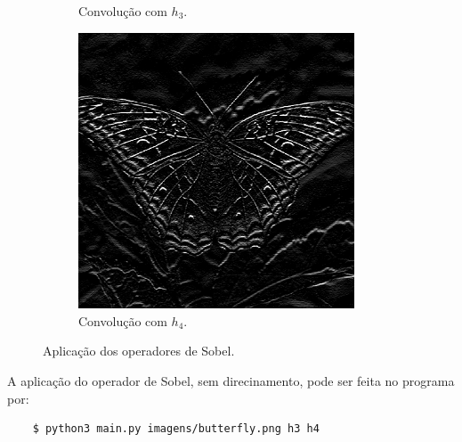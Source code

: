 \begin{figure}[H]
\begin{subfigure}{0.48\textwidth}
        \caption{Convolução com $h_3$.}
        \label{fig:sobel:x}
    \end{subfigure}%
    \begin{subfigure}{0.48\textwidth}
        \centering
        \includegraphics[width=0.9\textwidth]{resultados/butterfly_h4.png}
        \caption{Convolução com $h_4$.}
        \label{fig:sobel:y}
    \end{subfigure}

    \caption{Aplicação dos operadores de Sobel.}
    \label{fig:sobel}
\end{figure}

A aplicação do operador de Sobel, sem direcinamento, pode ser feita no programa por:

\begin{verbatim}
    $ python3 main.py imagens/butterfly.png h3 h4
\end{verbatim}
